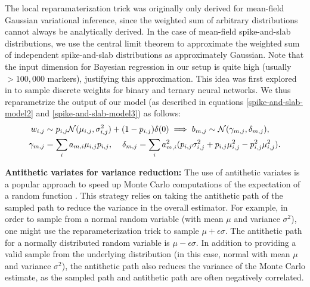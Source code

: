 %
The local reparamaterization trick was originally only derived for mean-field Gaussian variational inference, since the weighted sum of arbitrary distributions cannot always be analytically derived.
%
In the case of mean-field spike-and-slab distributions, we use the central limit theorem to approximate the weighted sum of independent spike-and-slab distributions as approximately Gaussian.
%
Note that the input dimension for Bayesian regression in our setup is quite high (usually $>100,000$ markers), justifying this approximation.
%
This idea was first explored in \cite{shayer2017learning} to sample discrete weights for binary and ternary neural networks.
%
We thus reparametrize the output of our model (as described in equations \ref{spike-and-slab-model2} and \ref{spike-and-slab-model3}) as follows:
\begin{align}
    w_{i,j} &\sim p_{i,j}\mathcal{N}(\mu_{i,j}, \sigma^2_{i,j}) + (1 - p_{i,j})\delta(0) \implies b_{m,j} \sim \mathcal{N}(\gamma_{m,j}, \delta_{m,j}),  \nonumber \\
    \gamma_{m,j} &= \sum_{i}a_{m,i}\mu_{i,j}p_{i,j} ,\hspace{4mm}\delta_{m,j} =  \sum_{i}a^2_{m,i}(p_{i,j}\sigma^2_{i,j} + p_{i,j}\mu^2_{i,j} - p^2_{i,j}\mu^2_{i,j}).
\end{align}


\vspace{2mm}
\noindent \textbf{Antithetic variates for variance reduction:}
%
The use of antithetic variates is a popular approach to speed up Monte Carlo computations of the expectation of a random function \cite{hammersley1956new}.
%
This strategy relies on taking the antithetic path of the sampled path to reduce the variance in the overall estimator.
%
For example, in order to sample from a normal random variable (with mean $\mu$ and variance $\sigma^2$), one might use the reparameterization trick to sample $\mu +\epsilon \sigma$.
%
The antithetic path for a normally distributed random variable is $\mu - \epsilon \sigma$.
%
In addition to providing a valid sample from the underlying distribution (in this case, normal with mean $\mu$ and variance $\sigma^2$), the antithetic path also reduces the variance of the Monte Carlo estimate, as the sampled path and antithetic path are often negatively correlated.
%

